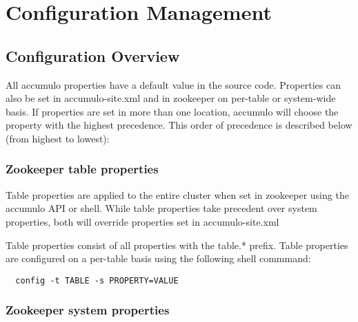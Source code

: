 
%
%

\chapter{Configuration Management}
\label{app:config}

\section{Configuration Overview}

All accumulo properties have a default value in the source code.  Properties can also be set
in accumulo-site.xml and in zookeeper on per-table or system-wide basis.  If properties are set in more than one location,
accumulo will choose the property with the highest precedence.  This order of precedence is described
below (from highest to lowest):

\subsection{Zookeeper table properties}
Table properties are applied to the entire cluster when set in zookeeper using the accumulo API or shell.  While table properties take precedent over system properties, both will override properties set in accumulo-site.xml

Table properties consist of all properties with the table.* prefix.  Table properties are configured on a per-table basis using the following shell commmand:
\begingroup\fontsize{8pt}{8pt}\selectfont\begin{verbatim}
  config -t TABLE -s PROPERTY=VALUE
\end{verbatim}\endgroup

\subsection{Zookeeper system properties}

